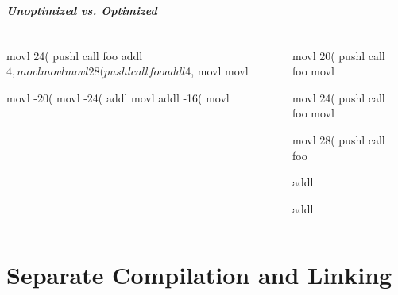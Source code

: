 \documentclass{plt}
\begin{document}
\begin{frame}[fragile]
  \frametitle{Unoptimized vs. Optimized}
\begin{columns}
  \begin{column}[t]{0.2\textwidth}
\fontsize{9}{9}\selectfont
\begin{semiverbatim}





movl 24(%
pushl %
call foo           
addl $4,%
movl %
movl %
		   
movl 28(%
pushl %
call foo           
addl $4,%
movl %
movl %
		   
movl -20(%
movl -24(%
addl %
movl %
addl -16(%
movl %
\end{semiverbatim}
  \end{column}
  \begin{column}[t]{0.2\textwidth}
\fontsize{9}{9}\selectfont
\begin{semiverbatim}
movl 20(%
pushl %
call foo          
movl %
		  
movl 24(%
pushl %
call foo          
movl %


		  
movl 28(%
pushl %
call foo          





		  
addl %

addl %
\end{semiverbatim}
  \end{column}
  \begin{column}[t]{0.3\textwidth}
    \vspace{5pc}
    \usebox{\callbox}
  \end{column}
\end{columns}

\end{frame}

\part{Separate Compilation and Linking}
\frame{\partpage}
\end{document}
